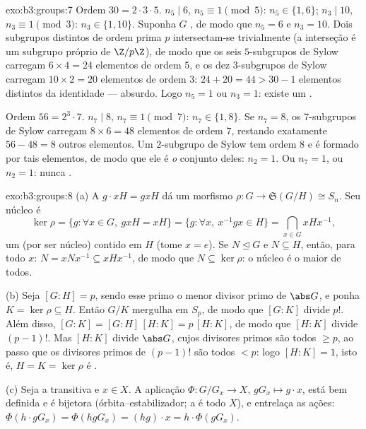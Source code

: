 \begin{solution}{exo:b3:groups:7}
Ordem $30 = 2 \cdot 3 \cdot 5$. $n_5 \mid 6$, $n_5 \equiv 1 \pmod
5$: $n_5 \in \{1, 6\}$; $n_3 \mid 10$, $n_3 \equiv 1 \pmod 3$: $n_3 \in \{1, 10\}$. Suponha $G$
, de modo que $n_5 = 6$ e $n_3 =
10$. Dois subgrupos distintos de ordem
prima $p$ intersectam-se trivialmente (a interseção é um subgrupo
próprio de $\Z/p\Z$), de modo que os seis $5$-subgrupos de Sylow
carregam $6 \times 4 = 24$ elementos de ordem $5$, e os dez $3$-subgrupos de
Sylow carregam $10 \times 2 = 20$ elementos de ordem $3$: $24 + 20 = 44 > 30 - 1$ elementos
distintos da identidade --- absurdo. Logo $n_5 = 1$ ou $n_3 = 1$: existe um
 .

Ordem $56 = 2^3 \cdot 7$. $n_7 \mid 8$, $n_7 \equiv 1 \pmod 7$: $n_7 \in \{1, 8\}$. Se $n_7 = 8$, os $7$-subgrupos de Sylow
carregam $8
\times 6 = 48$ elementos de ordem $7$, restando exatamente $56 - 48 =
8$
outros elementos. Um $2$-subgrupo de Sylow tem ordem $8$ e é
formado por tais elementos, de modo que ele é \emph{o} conjunto deles:
$n_2 = 1$. Ou $n_7 = 1$, ou $n_2 = 1$: nunca .
\end{solution}

\begin{solution}{exo:b3:groups:8}
(a) A  $g \cdot xH = gxH$ dá um morfismo $\rho \colon G
\to \mathfrak S(G/H) \cong S_n$. Seu núcleo é
\[
\ker\rho = \{g : \forall x \in G,\ gxH = xH\}
= \{g : \forall x,\ x^{-1}gx \in H\}
= \bigcap_{x \in G} xHx^{-1},
\]
um  (por ser núcleo) contido em $H$ (tome $x = e$).
Se $N \trianglelefteq G$ e $N \subseteq H$, então, para todo $x$: $N
= xNx^{-1} \subseteq xHx^{-1}$, de modo que $N \subseteq \ker\rho$: o
núcleo é o maior de todos.

(b) Seja $[G:H] = p$, sendo esse primo o menor divisor primo de $\abs G$,
e ponha $K =
\ker\rho \subseteq H$. Então $G/K$ mergulha em
$S_p$, de modo que $[G:K]$ divide $p!$. Além disso, $[G:K] = [G:H]\,[H:K] = p\,[H:K]$, de
modo que $[H:K]$ divide $(p-1)!$. Mas $[H:K]$ divide
$\abs G$, cujos divisores primos são todos $\geq p$, ao passo que
os divisores primos de $(p-1)!$ são todos $< p$: logo $[H:K] = 1$, isto
é, $H = K = \ker \rho$ é .

(c) Seja a  transitiva e $x \in X$. A aplicação $\Phi
\colon G/G_x \to X$, $gG_x \mapsto g \cdot x$, está bem
definida e é bijetora (órbita--estabilizador; a  é todo $X$), e
entrelaça as ações: $\Phi(h \cdot gG_x) = \Phi(hgG_x) = (hg)
\cdot x = h \cdot \Phi(gG_x)$.
\end{solution}

